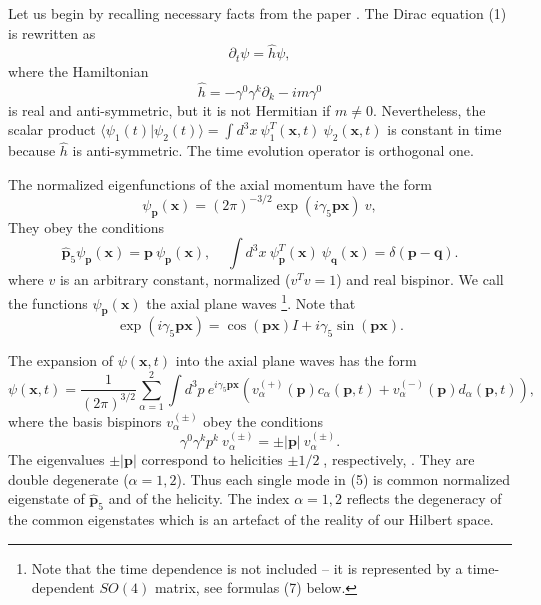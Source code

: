 \documentclass[12pt]{article}
\begin{document}
Let us begin by recalling necessary facts from the paper \cite{10}.  The Dirac equation (1)  is rewritten as  
\begin{equation} 
\partial_t \psi = \hat{h} \psi, 
\end{equation}
where the Hamiltonian 
\[ \hat{h} = - \gamma^0 \gamma^k \partial_k - i m \gamma^0 \]
 is real and anti-symmetric, but it is not Hermitian if $m\neq0$.  Nevertheless,  the scalar product  $ \langle \psi_1(t)|\psi_2(t) \rangle = \int\!d^3x\: 
\psi_1^T(\mathbf{x}, t)\: \psi_2(\mathbf{x},  t)     $ is constant in time because  $\hat{h}$  is anti-symmetric.  The time evolution operator is orthogonal one.   

The normalized eigenfunctions of  the axial  momentum have the form 
\begin{equation}
 \psi_{ \mathbf{p}}(\mathbf{x}) =  (2\pi)^{-3/2} \exp(i \gamma_5 \mathbf{p}\mathbf{x}) \: v,    
\end{equation}
They  obey the conditions 
\[  \hat{\mathbf{p}}_5 \psi_{ \mathbf{p}}(\mathbf{x}) =  \mathbf{p}\:  \psi_{ \mathbf{p}}(\mathbf{x}),  \;\;\;\; \int\!d^3x\:  \psi^{T}_{ \mathbf{p}}(\mathbf{x})\: \psi_{\mathbf{q}}(\mathbf{x}) = \delta(\mathbf{p} - \mathbf{q}).  \] 
 where  $v$ is an arbitrary constant, normalized ($ v^T v=1$) and real  bispinor.   
We call the functions $\psi_{\mathbf{p}}(\mathbf{x})$ the axial plane waves \footnote{Note that the time dependence is not included  --  it is represented by a time-dependent $SO(4) $ matrix, see formulas (7) below.}.  Note that  \[  \exp(i \gamma_5 \mathbf{p}\mathbf{x}) =  \cos(\mathbf{p}\mathbf{x}) I  + i \gamma_5 \sin( \mathbf{p}  \mathbf{x} ). \] 


The  expansion  of $\psi(\mathbf{x}, t) $  into the axial plane waves has the form 
\begin{equation}\psi(\mathbf{x}, t) = \frac{1}{(2\pi)^{3/2}} \sum_{\alpha=1}^2 \int\!d^3p\: e^{i \gamma_5 \mathbf{p} \mathbf{x}} \left(v_{\alpha}^{( +)}(\mathbf{p})  c_{\alpha}(\mathbf{p},t) +  v_{\alpha}^{( -)}(\mathbf{p})  d_{\alpha}(\mathbf{p},t)\right),  \end{equation}
 where the basis bispinors $v_{\alpha}^{(\pm)}$ obey the conditions  
\[ \gamma^0 \gamma^k p^k \:v^{(\pm)}_{\alpha} = \pm |\mathbf{p}| \:v^{(\pm)}_{\alpha}. \] 
 The eigenvalues $ \pm |\mathbf{p}|$ correspond to helicities $ \pm 1/2\;$, respectively, \cite{10}. They    are double degenerate ($\alpha=1,2$).   Thus each single mode in (5) is common normalized eigenstate of $\hat{\mathbf{p}}_5$ and of the helicity. 
The index $\alpha= 1,2$ reflects the degeneracy of the common eigenstates which is an artefact of the reality of our Hilbert space.
\end{document}
